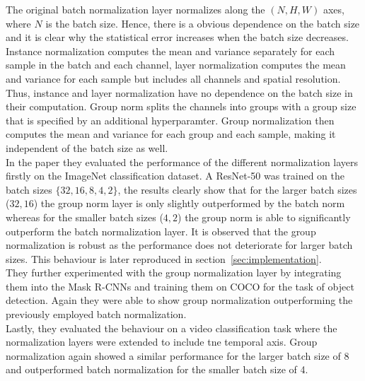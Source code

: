 The original batch normalization layer normalizes along the $(N, H, W)$ axes, where $N$ is the batch size.
Hence, there is a obvious dependence on the batch size and it is clear why the statistical error increases when the batch size decreases.
Instance normalization computes the mean and variance separately for each sample in the batch and each channel,
layer normalization computes the mean and variance for each sample but includes all channels and spatial resolution.
Thus, instance and layer normalization have no dependence on the batch size in their computation.
Group norm splits the channels into groups with a group size that is specified by an additional hyperparamter.
Group normalization then computes the mean and variance for each group and each sample, making it independent of the batch size as well.\\

In the paper they evaluated the performance of the different normalization layers firstly on the ImageNet classification dataset.
A ResNet-50 was trained on the batch sizes $\{32, 16, 8, 4, 2\}$, the results clearly show that for the larger batch sizes ($32, 16$) the group norm layer is only slightly outperformed by the batch norm whereas for the smaller
batch sizes ($4,2$) the group norm is able to significantly outperform the batch normalization layer.
It is observed that the group normalization is robust as the performance does not deteriorate for larger batch sizes.
This behaviour is later reproduced in section~\ref{sec:implementation}.\\
They further experimented with the group normalization layer by integrating them into the Mask R-CNNs and training them on COCO for the task of object detection.
Again they were able to show group normalization outperforming the previously employed batch normalization.\\
Lastly, they evaluated the behaviour on a video classification task where the normalization layers were extended to include tne temporal axis.
Group normalization again showed a similar performance for the larger batch size of 8 and outperformed batch normalization for the smaller batch size of 4.

